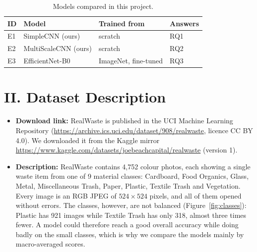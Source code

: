 \documentclass{article}
\begin{document}
\begin{table}[H]
\centering
\caption{Models compared in this project.}
\label{tab:models}
\begin{tabular}{llll}
\toprule
ID & Model & Trained from & Answers \\
\midrule
E1 & SimpleCNN (ours) & scratch & RQ1 \\
E2 & MultiScaleCNN (ours) & scratch & RQ2 \\
E3 & EfficientNet-B0 & ImageNet, fine-tuned & RQ3 \\
\bottomrule
\end{tabular}
\end{table}

\section{II. Dataset Description}

\begin{itemize}
  \item \textbf{Download link:} RealWaste \cite{realwaste} is published in the UCI Machine Learning Repository (\url{https://archive.ics.uci.edu/dataset/908/realwaste}, licence CC BY 4.0). We downloaded it from the Kaggle mirror \url{https://www.kaggle.com/datasets/joebeachcapital/realwaste} (version 1).
  \item \textbf{Description:} RealWaste contains 4,752 colour photos, each showing a single waste item from one of 9 material classes: Cardboard, Food Organics, Glass, Metal, Miscellaneous Trash, Paper, Plastic, Textile Trash and Vegetation. Every image is an RGB JPEG of $524\times524$ pixels, and all of them opened without errors. The classes, however, are not balanced (Figure~\ref{fig:classes}): Plastic has 921 images while Textile Trash has only 318, almost three times fewer. A model could therefore reach a good overall accuracy while doing badly on the small classes, which is why we compare the models mainly by macro-averaged scores.
\end{itemize}
\end{document}
